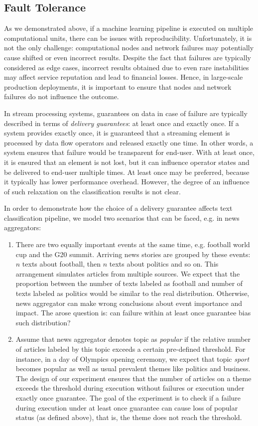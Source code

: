 \subsection{Fault Tolerance}

As we demonstrated above, if a machine learning pipeline is executed on multiple computational units, there can be issues with reproducibility. Unfortunately, it is not the only challenge: computational nodes and network failures may potentially cause shifted or even incorrect results. Despite the fact that failures are typically considered as edge cases, incorrect results obtained due to even rare instabilities may affect service reputation and lead to financial losses. Hence, in large-scale production deployments, it is important to ensure that nodes and network failures do not influence the outcome.

In stream processing systems, guarantees on data in case of failure are typically described in terms of {\em delivery guarantees}: at least once and exactly once. If a system provides exactly once, it is guaranteed that a streaming element is processed by data flow operators and released exactly one time. In other words, a system ensures that failure would be transparent for end-user. With at least once, it is ensured that an element is not lost, but it can influence operator states and be delivered to end-user multiple times. At least once may be preferred, because it typically has lower performance overhead. However, the degree of an influence of such relaxation on the classification results is not clear.

In order to demonstrate how the choice of a delivery guarantee affects text classification pipeline, we model two scenarios that can be faced, e.g. in news aggregators:
\begin{enumerate}
    \item There are two equally important events at the same time, e.g. football world cup and the G20 summit. Arriving news stories are grouped by these events: $n$ texts about football, then $n$ texts about politics and so on. This arrangement simulates articles from multiple sources. We expect that the proportion between the number of texts labeled as football and number of texts labeled as politics would be similar to the real distribution. Otherwise, news aggregator can make wrong conclusions about event importance and impact. The arose question is: can failure within at least once guarantee bias such distribution?
    \item Assume that news aggregator denotes topic as {\em popular} if the relative number of articles labeled by this topic exceeds a certain pre-defined threshold. For instance, in a day of Olympics opening ceremony, we expect that topic {\em sport} becomes popular as well as usual prevalent themes like politics and business. The design of our experiment ensures that the number of articles on a theme exceeds the threshold during execution without failures or execution under exactly once guarantee. The goal of the experiment is to check if a failure during execution under at least once guarantee can cause loss of popular status (as defined above), that is, the theme does not reach the threshold. 
\end{enumerate}

